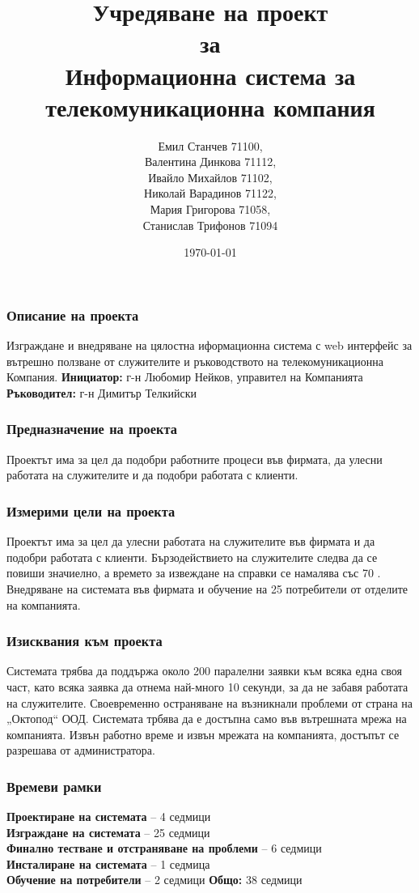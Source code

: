 \documentclass{beamer}
\title[Учредяване на проект за Информационна система за телекомуникационна компания]{Учредяване на проект \\ за \\ Информационна система за телекомуникационна компания}
\author{Емил Станчев 71100,\\
Валентина Динкова 71112,\\
Ивайло Михайлов 71102,\\
Николай Варадинов 71122,\\
Мария Григорова 71058,\\
Станислав Трифонов 71094}
\institute{ФМИ}
\date{\today}
\begin{document}
\begin{frame}
  \titlepage
\end{frame}



\begin{frame}
  \frametitle{Описание на проекта}
Изграждане и внедряване на цялостна иформационна система с web интерфейс за вътрешно ползване 
от служителите и ръководството на телекомуникационна Компания. 
\newline
\newline
\textbf{Инициатор:} г-н Любомир Нейков, управител на Компанията
\textbf{Ръководител:} г-н Димитър Телкийски
\end{frame}


\begin{frame}
  \frametitle{Предназначение на проекта}
Проектът има за цел да подобри  работните процеси във фирмата, да улесни работата на служителите
и да подобри работата с клиенти. 
\end{frame}

\begin{frame}
  \frametitle{Измерими цели на проекта}
Проектът има за цел да улесни работата на служителите във фирмата и да подобри работата с клиенти. 
Бързодействието на служителите следва да се повиши значиелно, а времето за извеждане на справки се 
намалява със 70 \textdiscount .
\newline
\newline
Внедряване на системата във фирмата и обучение на 25 потребители от отделите на компанията.
\end{frame}

\begin{frame}
  \frametitle{Изисквания към проекта}
Системата трябва да поддържа около 200 паралелни заявки към всяка една своя част, като 
всяка заявка да отнема най-много 10 секунди, за да не забавя работата на служителите.
Своевременно остраняване на възникнали проблеми от страна на „Октопод“ ООД.
Системата трбява да е достъпна само във вътрешната мрежа на компанията. 
Извън работно време  и извън мрежата на компанията, достъпът се разрешава от администратора. 
\end{frame}

\begin{frame}
  \frametitle{Времеви рамки}
\textbf{Проектиране на системата} – 4 седмици \\
\textbf{Изграждане на системата} – 25 седмици \\
\textbf{Финално тестване и отстраняване на проблеми} – 6 седмици \\
\textbf{Инсталиране на системата} – 1 седмица \\
\textbf{Обучение на потребители} – 2 седмици
\newline
\newline
\textbf{Общо:} 38 седмици 

\end{frame}
\end{document}
